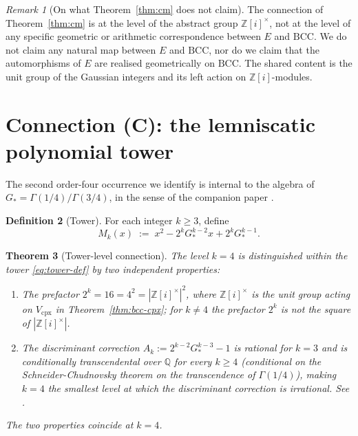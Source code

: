 \documentclass[11pt,reqno]{amsart}
\theoremstyle{plain}
\newtheorem{theorem}{Theorem}[section]
\theoremstyle{definition}
\newtheorem{definition}[theorem]{Definition}
\theoremstyle{remark}
\newtheorem{remark}[theorem]{Remark}
\numberwithin{equation}{section}
\newcommand{\Gstar}{G_{\!*}}
\newcommand{\BCC}{\mathrm{BCC}}
\newcommand{\Vcpx}{V_{\mathrm{cpx}}}
\begin{document}
\begin{remark}[On what Theorem~\ref{thm:cm} does not claim]
The connection of Theorem~\ref{thm:cm} is at the level of the
abstract group $\mathbb{Z}[i]^{\times}$, not at the level of any
specific geometric or arithmetic correspondence between $E$ and
$\BCC$. We do not claim any natural map between $E$ and $\BCC$, nor
do we claim that the automorphisms of $E$ are realised geometrically
on $\BCC$. The shared content is the unit group of the Gaussian
integers and its left action on $\mathbb{Z}[i]$-modules.
\end{remark}

\section{Connection (C): the lemniscatic polynomial tower}
\label{sec:tower}

The second order-four occurrence we identify is internal to the
algebra of $\Gstar = \Gamma(1/4)/\Gamma(3/4)$, in the sense of the
companion paper \cite{paper-a}.

\begin{definition}[Tower]
\label{def:tower}
For each integer $k \geq 3$, define
\begin{equation}
\label{eq:tower-def}
  M_{k}(x) \;:=\; x^{2} - 2^{k} \Gstar^{k-2} x + 2^{k} \Gstar^{k-1}.
\end{equation}
\end{definition}

\begin{theorem}[Tower-level connection]
\label{thm:tower-connection}
The level $k = 4$ is distinguished within the tower
\eqref{eq:tower-def} by two independent properties:
\begin{enumerate}[label=\textup{(\roman*)}, leftmargin=*]
\item The prefactor $2^{k} = 16 = 4^{2} =
|\mathbb{Z}[i]^{\times}|^{2}$, where $\mathbb{Z}[i]^{\times}$ is the
unit group acting on $\Vcpx$ in Theorem~\ref{thm:bcc-cpx}; for
$k \neq 4$ the prefactor $2^{k}$ is not the square of
$|\mathbb{Z}[i]^{\times}|$.
\item The discriminant correction $A_{k} := 2^{k-2} \Gstar^{k-3} -
1$ is rational for $k = 3$ and is conditionally transcendental over
$\mathbb{Q}$ for every $k \geq 4$ (conditional on the
Schneider-Chudnovsky theorem on the transcendence of $\Gamma(1/4)$),
making $k = 4$ the smallest level at which the discriminant
correction is irrational. See \cite[Theorem 3.2]{paper-a}.
\end{enumerate}
The two properties coincide at $k = 4$.
\end{theorem}
\end{document}
